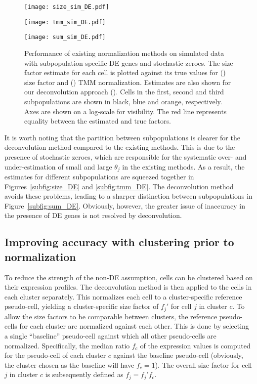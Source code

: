 \documentclass{article}
\begin{document}
\begin{figure}[tb]
\begin{minipage}{0.33\textwidth}
\texttt{[image: size\_sim\_DE.pdf]}
\subcaption{}\label{subfig:size_DE}
\end{minipage}
\begin{minipage}{0.33\textwidth}
\texttt{[image: tmm\_sim\_DE.pdf]}
\subcaption{}\label{subfig:tmm_DE}
\end{minipage}
\begin{minipage}{0.33\textwidth}
\texttt{[image: sum\_sim\_DE.pdf]}
\subcaption{}\label{subfig:sum_DE}
\end{minipage}
\caption{
    Performance of existing normalization methods on simulated data with subpopulation-specific DE genes and stochastic zeroes.
    The size factor estimate for each cell is plotted against its true values for () size factor and () TMM normalization.
    Estimates are also shown for our deconvolution approach ().
    Cells in the first, second and third subpopulations are shown in black, blue and orange, respectively.
    Axes are shown on a log-scale for visibility.
    The red line represents equality between the estimated and true factors.
}
\label{fig:sim_DE}
\end{figure}

It is worth noting that the partition between subpopulations is clearer for the deconvolution method compared to the existing methods.
This is due to the presence of stochastic zeroes, which are responsible for the systematic over- and under-estimation of small and large $\theta_j$ in the existing methods.
As a result, the estimates for different subpopulations are squeezed together in Figures~\ref{subfig:size_DE} and \ref{subfig:tmm_DE}.
The deconvolution method avoids these problems, leading to a sharper distinction between subpopulations in Figure~\ref{subfig:sum_DE}. 
Obviously, however, the greater issue of inaccuracy in the presence of DE genes is not resolved by deconvolution.

\subsection{Improving accuracy with clustering prior to normalization}
To reduce the strength of the non-DE assumption, cells can be clustered based on their expression profiles.
The deconvolution method is then applied to the cells in each cluster separately.
This normalizes each cell to a cluster-specific reference pseudo-cell, yielding a cluster-specific size factor of $f_{j}'$ for cell $j$ in cluster $c$.
To allow the size factors to be comparable between clusters, the reference pseudo-cells for each cluster are normalized against each other.
This is done by selecting a single ``baseline'' pseudo-cell against which all other pseudo-cells are normalized.
Specifically, the median ratio $f_c$ of the expression values is computed for the pseudo-cell of each cluster $c$ against the baseline pseudo-cell
    (obviously, the cluster chosen as the baseline will have $f_c=1$).
The overall size factor for cell $j$ in cluster $c$ is subsequently defined as $f_j = f_{j}'f_c$.
\end{document}
